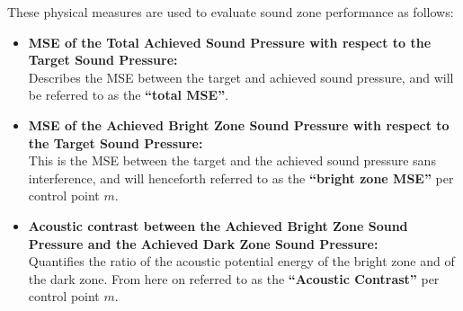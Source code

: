 These physical measures are used to evaluate sound zone performance as follows:
\begin{itemize}
    \item \textbf{MSE of the Total Achieved Sound Pressure with respect to the Target Sound Pressure:}\\
        Describes the MSE between the target and achieved sound pressure, and will be referred to as the 
        \textbf{``total MSE''}.
    \item \textbf{MSE of the Achieved Bright Zone Sound Pressure with respect to the Target Sound Pressure:}\\
        This is the MSE between the target and the achieved sound pressure sans interference, 
        and will henceforth referred to as the \textbf{``bright zone MSE''} per control point $m$.
    \item \textbf{Acoustic contrast between the Achieved Bright Zone Sound Pressure and the 
        Achieved Dark Zone Sound Pressure:}\\
        Quantifies the ratio of the acoustic potential energy of the bright zone and of the dark zone.
        From here on referred to as the \textbf{``Acoustic Contrast''} per control point $m$.
\end{itemize}
